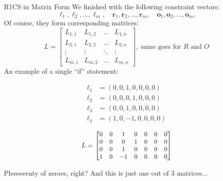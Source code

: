 \documentclass{zkdl-presentation-template}
\begin{document}
    \begin{frame}{R1CS in Matrix Form}
        We finished with the following constraint vectors:
        \begin{equation*}
            \boldsymbol{\ell}_1, \boldsymbol{\ell}_2, \dots, \boldsymbol{\ell}_m, \quad
            \boldsymbol{r}_1, \boldsymbol{r}_2, \dots, \boldsymbol{r}_m, \quad
            \boldsymbol{o}_1, \boldsymbol{o}_2, \dots, \boldsymbol{o}_m.
        \end{equation*}
        \pause
        Of course, they form corresponding matrices:
        \begin{equation*}
            L = \begin{bmatrix}
                L_{1,1} & L_{1,2} & \dots & L_{1,n} \\
                L_{2,1} & L_{2,2} & \dots & L_{2,n} \\
                \vdots & \vdots & \ddots & \vdots \\
                L_{m,1} & L_{m,2} & \dots & L_{m,n}
            \end{bmatrix}, \;
            \text{same goes for $R$ and $O$}
        \end{equation*}
        \pause
        An example of a single ``if'' statement:
        \begin{center}
        \begin{minipage}{0.4\textwidth}
        \vspace{-15pt}
        {\small \begin{align*}
            \boldsymbol{\ell}_1 &= (0, 0, 1, 0, 0, 0, 0) \\
            \boldsymbol{\ell}_2 &= (0, 0, 0, 1, 0, 0, 0) \\
            \boldsymbol{\ell}_3 &= (0, 0, 1, 0, 0, 0, 0) \\
            \boldsymbol{\ell}_4 &= (1, 0, -1, 0, 0, 0, 0)
        \end{align*}}
        \end{minipage}
        \begin{minipage}{0.5\textwidth}
        \begin{equation*}
            L = {\small \begin{bmatrix}
                0 & 0 & 1 & 0 & 0 & 0 & 0 \\
                0 & 0 & 0 & 1 & 0 & 0 & 0 \\
                0 & 0 & 1 & 0 & 0 & 0 & 0 \\
                1 & 0 & -1 & 0 & 0 & 0 & 0
            \end{bmatrix}}
        \end{equation*}
        \end{minipage}
        \end{center}
        \pause

        Pleeeeeenty of zeroes, right? And this is just one out of 3 matrices...
    \end{frame}
\end{document}
